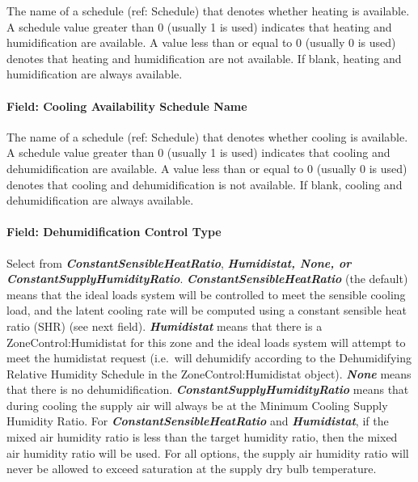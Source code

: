 The name of a schedule (ref: Schedule) that denotes whether heating is available. A schedule value greater than 0 (usually 1 is used) indicates that heating and humidification are available. A value less than or equal to 0 (usually 0 is used) denotes that heating and humidification are not available. If blank, heating and humidification are always available.

\paragraph{Field: Cooling Availability Schedule Name}\label{field-cooling-availability-schedule-name-001}

The name of a schedule (ref: Schedule) that denotes whether cooling is available. A schedule value greater than 0 (usually 1 is used) indicates that cooling and dehumidification are available. A value less than or equal to 0 (usually 0 is used) denotes that cooling and dehumidification is not available. If blank, cooling and dehumidification are always available.

\paragraph{Field: Dehumidification Control Type}\label{field-dehumidification-control-type-002}

Select from \textbf{\emph{ConstantSensibleHeatRatio}}, \textbf{\emph{Humidistat, None, or ConstantSupplyHumidityRatio}}. \textbf{\emph{ConstantSensibleHeatRatio}} (the default) means that the ideal loads system will be controlled to meet the sensible cooling load, and the latent cooling rate will be computed using a constant sensible heat ratio (SHR) (see next field). \textbf{\emph{Humidistat}} means that there is a ZoneControl:Humidistat for this zone and the ideal loads system will attempt to meet the humidistat request (i.e.~will dehumidify according to the Dehumidifying Relative Humidity Schedule in the ZoneControl:Humidistat object). \textbf{\emph{None}} means that there is no dehumidification. \textbf{\emph{ConstantSupplyHumidityRatio}} means that during cooling the supply air will always be at the Minimum Cooling Supply Humidity Ratio. For \textbf{\emph{ConstantSensibleHeatRatio}} and \textbf{\emph{Humidistat}}, if the mixed air humidity ratio is less than the target humidity ratio, then the mixed air humidity ratio will be used. For all options, the supply air humidity ratio will never be allowed to exceed saturation at the supply dry bulb temperature.

